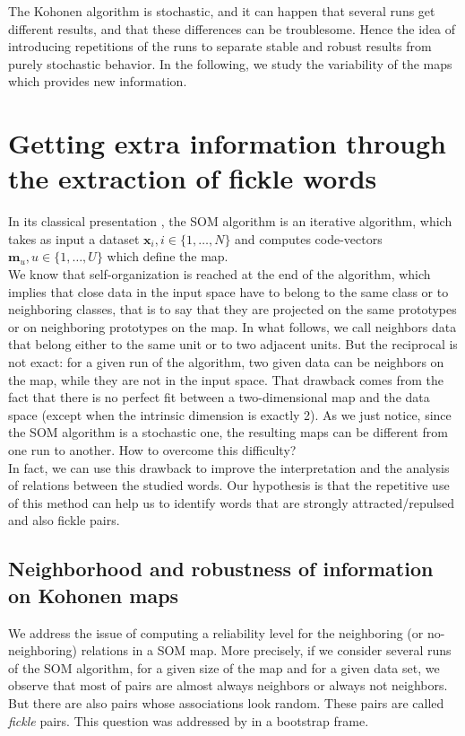 \documentclass[preprint]{elsarticle}
\begin{document}
The Kohonen algorithm is stochastic, and it can  happen that several runs get different results, and that these differences can be troublesome. Hence the idea of introducing repetitions of the runs to separate stable and robust results from purely stochastic behavior. In the following, we study the variability of the maps which provides new information.


\section{Getting extra information through the extraction of fickle words}\label{method}

In its classical presentation \cite{kohonen95,cottrell98}, the SOM algorithm is an iterative algorithm, which takes as input a dataset $\mathbf{x}_i, i\in\{1,\hdots,N\}$ and computes code-vectors $\mathbf{m}_u, u\in\{1,\hdots,U\}$ which define the map.\\

We know that self-organization is reached at the end of the algorithm, which implies that close data in the input space have to belong to the same class or to neighboring classes, that is to say that they are projected on the same prototypes or on neighboring prototypes on the map. In what follows, we call neighbors data that belong either to the same unit or to two adjacent units. But the reciprocal is not exact: for a given run of the algorithm, two given data can be neighbors on the map, while they are not in the input space. That drawback comes from the fact that there is no perfect fit between a two-dimensional map and the data space (except when the intrinsic dimension is exactly 2). As we just notice, since the SOM algorithm is a stochastic one, the resulting maps can be different from one run to another. How to overcome this difficulty?\\

In fact, we can use this drawback to improve the interpretation and the analysis of relations between the studied words. Our hypothesis is that the repetitive use of this method can help us to identify words that are strongly attracted/repulsed and also fickle pairs.

\subsection{Neighborhood and robustness of information on Kohonen maps}

We address the issue of computing a reliability level for the neighboring (or no-neighboring) relations in a SOM map. More precisely, if we consider several runs of the SOM algorithm, for a given size of the map and for a given data set, we observe that most of pairs are almost always neighbors or always not neighbors. But there are also pairs whose associations look random. These pairs are called \textit{fickle} pairs. This question was addressed by \cite{debodt02} in a bootstrap frame.\\
\end{document}
